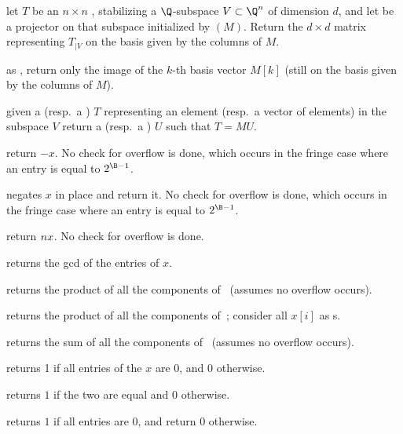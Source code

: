  let $T$ be an $n\times n$
, stabilizing a $\Q$-subspace $V\subset \Q^n$ of dimension $d$, and
let  be a projector on that subspace initialized by
$(M)$. Return the $d\times d$ matrix representing $T_{|V}$
on the basis given by the columns of $M$.

 as
, return only the image of the $k$-th basis vector $M[k]$
(still on the basis given by the columns of $M$).

 given a  (resp.~a )
$T$ representing an element (resp.~a vector of elements) in the subspace $V$
return a  (resp.~a ) $U$ such that $T = MU$.


 return $-x$. No check for overflow is done, which
occurs in the fringe case where an entry is equal to $2^{\B-1}$.

 negates $x$ in place and return it. No check
for overflow is done, which occurs in the fringe case where an entry is equal
to $2^{\B-1}$.



 return $n\*x$. No check for overflow is
done.

 returns the gcd of the entries of $x$.


 returns the product of all the components
of~ (assumes no overflow occurs).

 returns the product of all the components
of~; consider all $x[i]$ as s.

 returns the sum of all the components
of~ (assumes no overflow occurs).

 returns 1 if all entries of the  $x$ are $0$,
and $0$ otherwise.

 returns $1$ if the two  are equal
and $0$ otherwise.

 returns $1$ if all entries are $0$, and return
$0$ otherwise.

